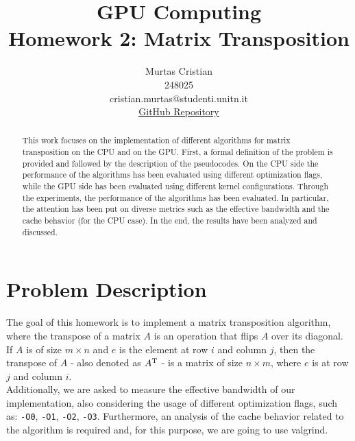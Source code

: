 \documentclass{IEEEconf}
\title{\textbf{GPU Computing} \\
    \large Homework 2: Matrix Transposition \\
}
\author{Murtas Cristian \\ 248025 \\ cristian.murtas@studenti.unitn.it \\
\underline{\href{https://github.com/SecondarySkyler/gpu-computing/tree/main/cuda_matrix_transposition}{GitHub Repository}}
}
\begin{document}
\maketitle
\begin{abstract}
    This work focuses on the implementation of different algorithms for matrix transposition on the CPU and on the GPU.
    First, a formal definition of the problem is provided and followed by the description of the pseudocodes.
    On the CPU side the performance of the algorithms has been evaluated using different optimization flags, while the GPU side has been evaluated using different kernel configurations.
    Through the experiments, the performance of the algorithms has been evaluated. In particular, the attention has been put on diverse metrics
    such as the effective bandwidth and the cache behavior (for the CPU case).
    In the end, the results have been analyzed and discussed.
\end{abstract}
\section{Problem Description}
The goal of this homework is to implement a matrix transposition algorithm, where the transpose of a matrix $A$
is an operation that flips $A$ over its diagonal. 
If $A$ is of size $m \times n$ and $e$ is the element at row $i$ and column $j$, then the transpose of $A$ - also denoted as $A\textsuperscript{T}$ - 
is a matrix of size $n \times m$, where $e$ is at row $j$ and column $i$.  \\
Additionally, we are asked to measure the effective bandwidth of our implementation, also considering  the
usage of different optimization flags, such as: \texttt{-O0}, \texttt{-O1}, \texttt{-O2}, \texttt{-O3}.
Furthermore, an analysis of the cache behavior related to the algorithm is required and, for this purpose, we are going to use
valgrind.
\end{document}
